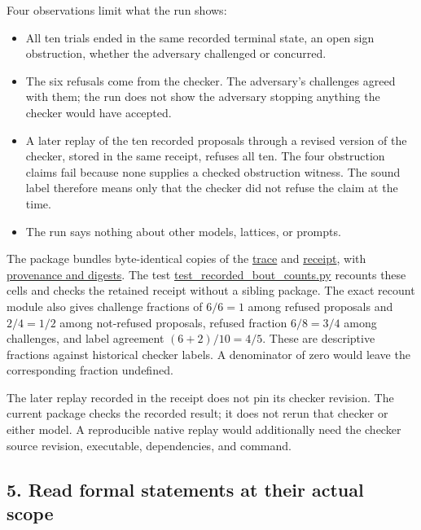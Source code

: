 \documentclass[
  11pt,
]{article}
\providecommand{\tightlist}{%
  \setlength{\itemsep}{0pt}\setlength{\parskip}{0pt}}
\begin{document}
Four observations limit what the run shows:

\begin{itemize}
\tightlist
\item
  All ten trials ended in the same recorded terminal state, an open sign
  obstruction, whether the adversary challenged or concurred.
\item
  The six refusals come from the checker. The adversary's challenges
  agreed with them; the run does not show the adversary stopping
  anything the checker would have accepted.
\item
  A later replay of the ten recorded proposals through a revised version
  of the checker, stored in the same receipt, refuses all ten. The four
  obstruction claims fail because none supplies a checked obstruction
  witness. The sound label therefore means only that the checker did not
  refuse the claim at the time.
\item
  The run says nothing about other models, lattices, or prompts.
\end{itemize}

The package bundles byte-identical copies of the
\href{docs/historical_evidence/demo2_r7_adversarial_debate_1790210039.jsonl}{trace}
and
\href{docs/historical_evidence/demo2_r7_adversarial_debate_receipt.json}{receipt},
with \href{docs/historical_evidence/provenance.json}{provenance and
digests}. The test
\href{code/tests/test_recorded_bout_counts.py}{test\_recorded\_bout\_counts.py}
recounts these cells and checks the retained receipt without a sibling
package. The exact recount module also gives challenge fractions of
\(6/6=1\) among refused proposals and \(2/4=1/2\) among not-refused
proposals, refused fraction \(6/8=3/4\) among challenges, and label
agreement \((6+2)/10=4/5\). These are descriptive fractions against
historical checker labels. A denominator of zero would leave the
corresponding fraction undefined.

The later replay recorded in the receipt does not pin its checker
revision. The current package checks the recorded result; it does not
rerun that checker or either model. A reproducible native replay would
additionally need the checker source revision, executable, dependencies,
and command.

\hypertarget{read-formal-statements-at-their-actual-scope}{%
\subsection{5. Read formal statements at their actual
scope}\label{read-formal-statements-at-their-actual-scope}}
\end{document}

